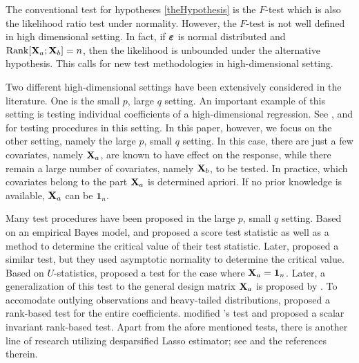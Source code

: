 \documentclass[11pt]{article}
\DeclareMathOperator{\myRank}{Rank}
\theoremstyle{plain}
\theoremstyle{definition}
\theoremstyle{remark}
\begin{document}
The conventional test for hypotheses \eqref{theHypothesis} is the $F$-test which is also the likelihood ratio test under normality.
However, the $F$-test is not well defined in high dimensional setting.
In fact, if $\boldsymbol{\varepsilon}$ is normal distributed and $\myRank[\BX_a;\BX_b]=n$, then the likelihood is unbounded under the alternative hypothesis.
This calls for new test methodologies in high-dimensional setting.

Two different high-dimensional settings have been extensively considered in the literature.
One is the small $p$, large $q$ setting.
An important example of this setting is testing individual coefficients of a high-dimensional regression.
See \cite{buhlmann2013statistical}, \cite{Zhang2013} and \cite{Lan2016} for testing procedures in this setting.
In this paper, however, we focus on the other setting, namely the large $p$, small $q$ setting.
In this case, there are just a few covariates, namely $\mathbf{X}_a$, are known to have effect on the response, while there remain a large number of covariates, namely $\mathbf{X}_b$, to be tested.
In practice, which covariates belong to the part $\mathbf{X}_a$ is determined apriori.
If no prior knowledge is available, $\mathbf{X}_a$ can be $\mathbf 1_n$.

Many test procedures have been proposed in the large $p$, small $q$ setting.
Based on an empirical Bayes model, \cite{Goeman2006} and \cite{Goeman2011} proposed a score test statistic as well as a method to determine the critical value of their test statistic.
Later, \cite{Lan2014Testing} proposed a similar test, but they used asymptotic normality to determine the critical value.
Based on $U$-statistics,
\cite{Zhong2011Tests} proposed a test for the case where $\mathbf{X}_a=\mathbf 1_n$.
Later, a generalization of this test to the general design matrix $\mathbf{X}_a$ is proposed by \cite{Wang2015}.
To accomodate outlying observations and heavy-tailed distributions, \cite{Feng2013}
proposed a rank-based test for the entire coefficients.
\cite{Xu2016a} modified \cite{Feng2013}'s test and proposed a scalar invariant rank-based test.
Apart from the afore mentioned tests,
there is another line of research utilizing desparsified Lasso estimator; see \cite{zhang2016simultaneous} and the references therein.
\end{document}
